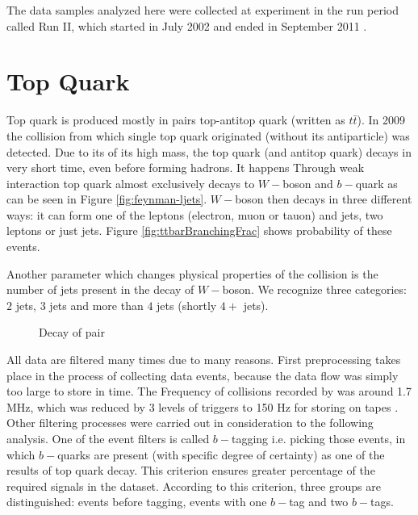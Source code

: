 The data samples analyzed here were collected at \dzero experiment in the run period called Run II, which started in July 2002 and ended in September 2011 \cite{Yuntse}.

\section{Top Quark} \label{sec:topQuark}
Top quark is produced mostly in pairs top-antitop quark (written as $t\bar{t}$). In 2009 the collision from which single top quark originated  (without its antiparticle) was detected. Due to its of its high mass, the top quark (and antitop quark) decays in very short time, even before forming hadrons. It happens Through weak interaction top quark almost exclusively decays to $W-$boson and $b-$quark as can be seen in Figure \ref{fig:feynman-ljets}. $W-$boson then decays in three different ways: it can form one of the leptons (electron, muon or tauon) and jets, two leptons or just jets. Figure \ref{fig:ttbarBranchingFrac} shows probability of these events. 

Another parameter which changes physical properties of the collision is the number of jets present in the decay of $W-$boson. We recognize three categories: $2$ jets, $3$ jets and more than $4$ jets (shortly $4+$ jets).

\begin{figure}[h]
  \centering
  \caption{Decay of \ttbar pair}
\end{figure} 

All data are filtered many times due to many reasons. First preprocessing takes  place in the process of collecting data events, because the data flow was simply too large to store in time. The Frequency of collisions recorded by \dzero was around 1.7 MHz, which was reduced by 3 levels of triggers to 150 Hz for storing on tapes \cite{Yuntse}. Other filtering processes were carried out in consideration to the following analysis. One of the event filters is called $b-$tagging i.e. picking those events, in which $b-$quarks are present (with specific degree of certainty) as one of the results of top quark decay. This criterion ensures greater percentage of the required signals in the dataset. According to this criterion, three groups are distinguished: events before tagging, events with one $b-$tag and two $b-$tags.

